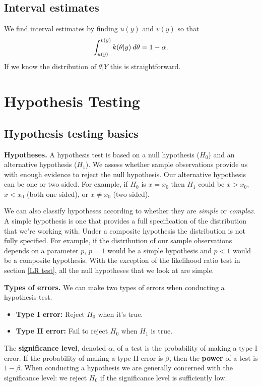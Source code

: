 \documentclass[10pt, two column]{article}
\begin{document}
\subsection{Interval estimates}

We find interval estimates by finding $u(y)$ and $v(y)$ so that \vspace{-10pt}
\[
\int_{u(y)}^{v(y)} k(\theta \vert y) \: d\theta = 1 - \alpha. \vspace{-5pt}
\]
If we know the distribution of $\theta \vert Y$ this is straightforward. 

\section{Hypothesis Testing}

\subsection{Hypothesis testing basics}

{\bf Hypotheses.} A hypothesis test is based on a null hypothesis ($H_{0}$) and an alternative hypothesis ($H_{1}$). We assess whether sample observations provide us with enough evidence to reject the null hypothesis. Our alternative hypothesis can be one or two sided. For example, if $H_{0}$ is $x = x_{0}$ then $H_{1}$ could be $x > x_{0}$, $x < x_{0}$ (both one-sided), or $x \neq x_{0}$ (two-sided). 
 
We can also classify hypotheses according to whether they are \emph{simple} or \emph{complex}. A simple hypothesis is one that provides a full specification of the distribution that we're working with. Under a composite hypothesis the distribution is not fully specified. For example, if the distribution of our sample observations depends on a parameter $p$, $p = 1$ would be a simple hypothesis and $p < 1$ would be a composite hypothesis. With the exception of the likelihood ratio test in section \ref{LR test}, all the null hypotheses that we look at are simple. 

{\bf Types of errors.} We can make two types of errors when conducting a hypothesis test. 
\begin{itemize}
\item {\bf Type I error:} Reject $H_{0}$ when it's true. 
\item {\bf Type II error:} Fail to reject $H_{0}$ when $H_{1}$ is true.
\end{itemize}
The {\bf significance level}, denoted $\alpha$, of a test is the probability of making a type I error. If the probability of making a type II error is $\beta$, then the {\bf power} of a test is $1 - \beta$. When conducting a hypothesis we are generally concerned with the significance level: we reject $H_{0}$ if the significance level is sufficiently low. 
\end{document}
